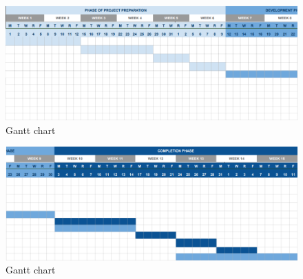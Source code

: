 \begin{figure}[ht]
    \centering
    \includegraphics[scale=0.5]{plan2.png}
    \caption{Gantt chart}
    \label{fig:plan2}
\end{figure}

\begin{figure}[ht]
    \centering
    \includegraphics[scale=0.5]{plan3.png}
    \caption{Gantt chart}
    \label{fig:plan3}
\end{figure}

